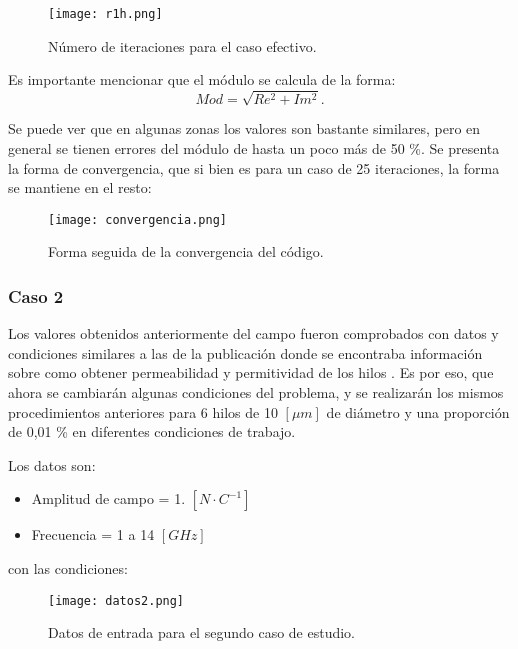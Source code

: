 \documentclass[12pt,letterpaper]{article}
\numberwithin{equation}{section}
\begin{document}
\begin{figure}[H]
	\centering\texttt{[image: r1h.png]}\\
	\caption{Número de iteraciones para el caso efectivo.}
	\label{fig:r1h}
\end{figure} 

Es importante mencionar que el módulo se calcula de la forma:
\begin{equation}
Mod = \sqrt{Re^2 + Im^2}.
\end{equation}

Se puede ver que en algunas zonas los valores son bastante similares, pero en general se tienen errores del módulo de hasta un poco más de 50 \%. Se presenta la forma de convergencia, que si bien es para un caso de 25 iteraciones, la forma se mantiene en el resto:

\begin{figure}[H]
	\centering\texttt{[image: convergencia.png]}\\
	\caption{Forma seguida de la convergencia del código.}
	\label{fig:convergencia}
\end{figure} 




\subsubsection{Caso 2}

Los valores obtenidos anteriormente del campo fueron comprobados con datos y condiciones similares a las de la publicación donde se encontraba información sobre como obtener permeabilidad y permitividad de los hilos \cite{Wire_theory_2}. Es por eso, que ahora se cambiarán algunas condiciones del problema, y se realizarán los mismos procedimientos anteriores para 6 hilos de 10 $[\mu m]$ de diámetro y una proporción de 0,01 \% en diferentes condiciones de trabajo. \cite{Wire_theory_1}

Los datos son:

\begin{itemize}
	\item Amplitud de campo = 1. $[N \cdotp C^{-1}]$
	\item Frecuencia = 1 a 14 $[GHz]$
\end{itemize}

con las condiciones:

\begin{figure}[H]
	\centering\texttt{[image: datos2.png]}\\
	\caption{Datos de entrada para el segundo caso de estudio.}
	\label{fig:datos2}
\end{figure} 
\end{document}

